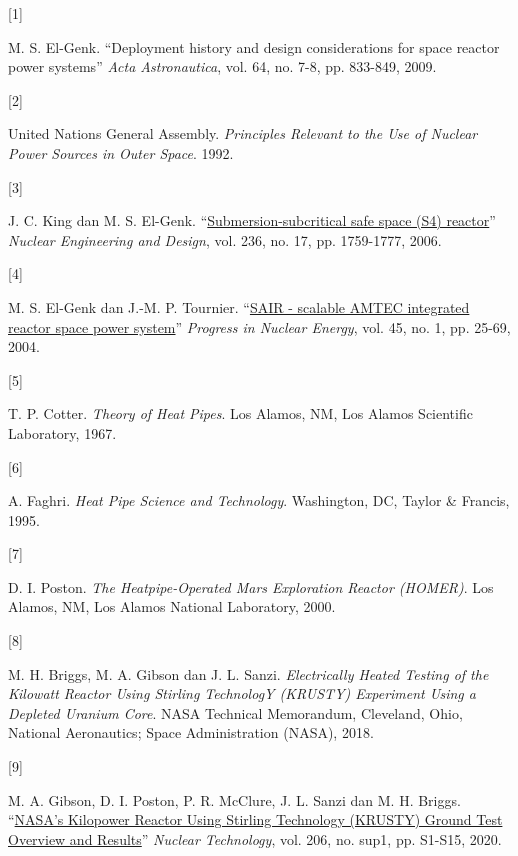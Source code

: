 \documentclass[
  indonesian,
  12pt,
  a4paper,
]{report}
\newlength{\cslhangindent}
\newlength{\csllabelwidth}
\newenvironment{CSLReferences}[2] %
 {\begin{list}{}{%
  \setlength{\itemindent}{0pt}
  \setlength{\leftmargin}{0pt}
  \setlength{\parsep}{0pt}
  \ifodd #1
   \setlength{\leftmargin}{\cslhangindent}
   \setlength{\itemindent}{-1\cslhangindent}
  \fi
  \setlength{\itemsep}{#2\baselineskip}}}
 {\end{list}}
\newcommand{\CSLLeftMargin}[1]{\parbox[t]{\csllabelwidth}{\strut#1\strut}}
\newcommand{\CSLRightInline}[1]{\parbox[t]{\linewidth - \csllabelwidth}{\strut#1\strut}}
\begin{document}
\protect{}\label{refs}
\begin{CSLReferences}{0}{1}
\CSLLeftMargin{{[}1{]} }%
\CSLRightInline{M. S. El-Genk. {``Deployment history and design
considerations for space reactor power systems''} \emph{Acta
Astronautica}, vol. 64, no. 7-8, pp. 833-849, 2009.}

\CSLLeftMargin{{[}2{]} }%
\CSLRightInline{United Nations General Assembly. \emph{Principles
Relevant to the Use of Nuclear Power Sources in Outer Space}. 1992.}

\CSLLeftMargin{{[}3{]} }%
\CSLRightInline{J. C. King dan M. S. El-Genk.
{``\href{https://doi.org/10.1016/j.nucengdes.2005.12.010}{Submersion-subcritical
safe space (S4) reactor}''} \emph{Nuclear Engineering and Design}, vol.
236, no. 17, pp. 1759-1777, 2006.}

\CSLLeftMargin{{[}4{]} }%
\CSLRightInline{M. S. El-Genk dan J.-M. P. Tournier.
{``\href{https://doi.org/10.1016/j.pnucene.2004.08.002}{SAIR - scalable
AMTEC integrated reactor space power system}''} \emph{Progress in
Nuclear Energy}, vol. 45, no. 1, pp. 25-69, 2004.}

\CSLLeftMargin{{[}5{]} }%
\CSLRightInline{T. P. Cotter. \emph{Theory of Heat Pipes}. Los Alamos,
NM, Los Alamos Scientific Laboratory, 1967.}

\CSLLeftMargin{{[}6{]} }%
\CSLRightInline{A. Faghri. \emph{Heat Pipe Science and Technology}.
Washington, DC, Taylor \& Francis, 1995.}

\CSLLeftMargin{{[}7{]} }%
\CSLRightInline{D. I. Poston. \emph{The Heatpipe-Operated Mars
Exploration Reactor (HOMER)}. Los Alamos, NM, Los Alamos National
Laboratory, 2000.}

\CSLLeftMargin{{[}8{]} }%
\CSLRightInline{M. H. Briggs, M. A. Gibson dan J. L. Sanzi.
\emph{Electrically Heated Testing of the Kilowatt Reactor Using Stirling
TechnologY (KRUSTY) Experiment Using a Depleted Uranium Core}. NASA
Technical Memorandum, Cleveland, Ohio, National Aeronautics; Space
Administration (NASA), 2018.}

\CSLLeftMargin{{[}9{]} }%
\CSLRightInline{M. A. Gibson, D. I. Poston, P. R. McClure, J. L. Sanzi
dan M. H. Briggs.
{``\href{https://doi.org/10.1080/00295450.2020.1725740}{NASA's Kilopower
Reactor Using Stirling Technology (KRUSTY) Ground Test Overview and
Results}''} \emph{Nuclear Technology}, vol. 206, no. sup1, pp. S1-S15,
2020.}


\end{CSLReferences}
\end{document}
